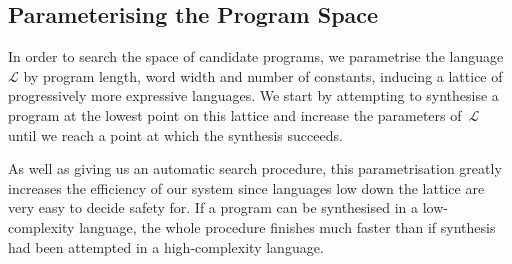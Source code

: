 \subsection{Parameterising the Program Space}


In order to search the space of candidate programs, we parametrise
the language~$\mathcal{L}$ by program length, word width and number of constants,
inducing a lattice of progressively
more expressive languages.  We start by attempting to synthesise
a program at the lowest point on this lattice and increase the
parameters of~$\mathcal{L}$ until we reach a point at which
the synthesis succeeds.

As well as giving us an automatic search procedure, this parametrisation
greatly increases the efficiency of our system since languages
low down the lattice are very easy to decide safety for.  If a program
can be synthesised in a low-complexity language, the whole procedure
finishes much faster than if synthesis had been attempted in a
high-complexity language.








